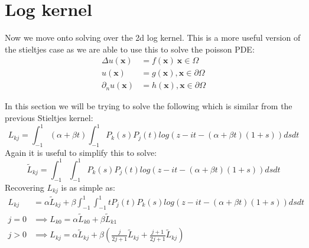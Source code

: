 \documentclass{article}
\begin{document}
\section{Log kernel}
Now we move onto solving over the 2d log kernel.
This is a more useful version of the stieltjes case as we are able to use this to solve the poisson PDE:
\begin{align}
    \Delta u(\textbf{x}) &= f(\textbf{x})\:\textbf{x}\in\Omega\\
    u(\textbf{x}) &= g(\textbf{x}), \textbf{x}\in\partial\Omega\\
    \partial_nu(\textbf{x}) &= h(\textbf{x}), \textbf{x}\in\partial\Omega
\end{align}

In this section we will be trying to solve the following which is similar from the previous Stieltjes kernel:
$$L_{kj}=\int_{-1}^1(\alpha+\beta t)\int_{-1}^1P_k(s)P_j(t)log(z-it-(\alpha+\beta t)(1+s))dsdt$$
Again it is useful to simplify this to solve:
$$\tilde{L}_{kj} = \int_{-1}^1\int_{-1}^1P_k(s)P_j(t)log(z-it-(\alpha+\beta t)(1+s))dsdt$$
Recovering $L_{kj}$ is as simple as:
\begin{align}
    L_{kj}&=\alpha \tilde{L}_{kj} + \beta\int_{-1}^1\int_{-1}^1tP_j(t)P_k(s)log(z-it-(\alpha+\beta t)(1+s))dsdt\\
    j=0 &\implies L_{k0}=\alpha\tilde{L}_{k0}+\beta\tilde{L}_{k1}\\
    j>0 &\implies L_{kj}=\alpha\tilde{L}_{kj}+\beta(\frac{j}{2j+1}\tilde{L}_{kj}+\frac{j+1}{2j+1}\tilde{L}_{kj})
\end{align}
\end{document}
